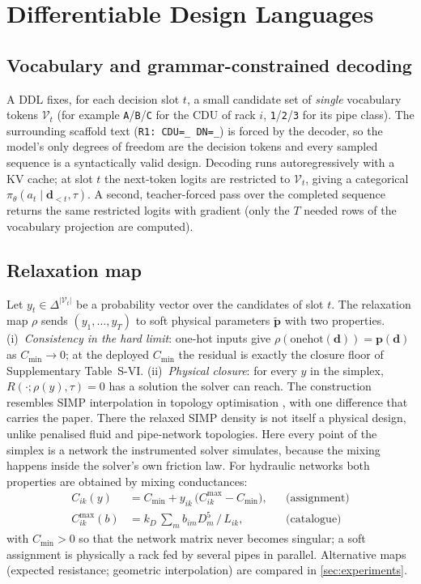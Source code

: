 \documentclass[journal]{IEEEtran}
\newcommand{\ddl}{DDL}
\newcommand{\design}{\bm{d}}
\newcommand{\soft}{\tilde{\bm{p}}}
\newcommand{\task}{\tau}
\begin{document}
\FloatBarrier
\section{Differentiable Design Languages}
\label{sec:method}

\subsection{Vocabulary and grammar-constrained decoding}
A \ddl{} fixes, for each decision slot $t$, a small candidate set of
\emph{single} vocabulary tokens $\mathcal V_t$ (for example \texttt{A}/\texttt{B}/\texttt{C}
for the CDU of rack $i$, \texttt{1}/\texttt{2}/\texttt{3} for its pipe
class).  The surrounding scaffold text (\texttt{R1: CDU=\_ DN=\_}) is forced by
the decoder, so the model's only degrees of freedom are the decision tokens
and every sampled sequence is a syntactically valid design.  Decoding runs
autoregressively with a KV cache; at slot $t$ the next-token logits are
restricted to $\mathcal V_t$, giving a categorical
$\pi_\theta(a_t\mid\design_{<t},\task)$.  A second, teacher-forced pass over the
completed sequence returns the same restricted logits with gradient
(only the $T$ needed rows of the vocabulary projection are computed).

\subsection{Relaxation map}
Let $y_t\in\Delta^{|\mathcal V_t|}$ be a probability vector over the candidates
of slot $t$.  The relaxation map $\rho$ sends $(y_1,\dots,y_T)$ to soft
physical parameters $\soft$ with two properties.  (i)~\emph{Consistency in the hard limit}: one-hot
inputs give $\rho(\mathrm{onehot}(\design))=\bm p(\design)$ as $C_{\min}\to0$; at the
deployed $C_{\min}$ the residual is exactly the closure floor of Supplementary Table~S-VI.
(ii)~\emph{Physical closure}: for every $y$ in the simplex,
$R(\cdot;\rho(y),\task)=0$ has a solution the solver can reach.  The construction
resembles SIMP interpolation in topology optimisation \cite{bendsoe1989simp}, with one
difference that carries the paper.  There the relaxed SIMP density is not itself a
physical design, unlike penalised fluid and pipe-network topologies.  Here every point of the simplex is a network the instrumented solver simulates,
because the mixing happens inside the solver's own friction law.  For hydraulic networks both properties are
obtained by mixing conductances:
\begin{align}
  C_{ik}(y) &= C_{\min}+y_{ik}\,\big(C^{\max}_{ik}-C_{\min}\big), &&\text{(assignment)}\\
  C^{\max}_{ik}(b) &= k_D\,\textstyle\sum_m b_{im} D_m^{5}\,/\,L_{ik}, &&\text{(catalogue)}
\end{align}
with $C_{\min}>0$ so that the network matrix never becomes singular; a soft
assignment is physically a rack fed by several pipes in parallel.  Alternative
maps (expected resistance; geometric interpolation) are compared in
\cref{sec:experiments}.
\end{document}
